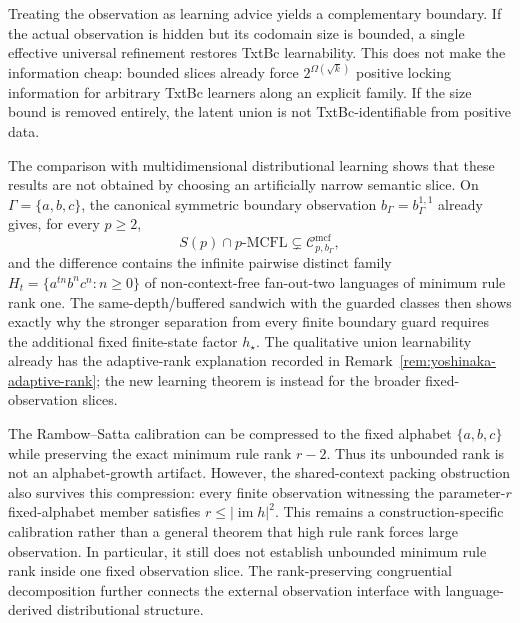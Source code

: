 \documentclass[11pt,a4paper]{article}
\numberwithin{equation}{section}
\theoremstyle{plain}
\theoremstyle{definition}
\theoremstyle{remark}
\newcommand{\Cmcf}[2]{\mathcal{C}^{\mathrm{mcf}}_{#1,#2}}
\begin{document}
Treating the observation as learning advice yields a complementary boundary.
If the actual observation is hidden but its codomain size is bounded, a single
effective universal refinement restores TxtBc learnability.  This does not
make the information cheap: bounded slices already force
$2^{\Omega(\sqrt{k})}$ positive locking information for arbitrary TxtBc
learners along an explicit family.  If the size bound is removed entirely, the
latent union is not TxtBc-identifiable from positive data.

The comparison with multidimensional distributional learning shows that these
results are not obtained by choosing an artificially narrow semantic slice.
On $\Gamma=\{a,b,c\}$, the canonical symmetric boundary observation
$b_\Gamma=b_\Gamma^{1,1}$ already gives, for every $p\ge2$,
\[
  S(p)\cap p\text{-}\mathrm{MCFL}
  \subsetneq
  \Cmcf{p}{b_\Gamma},
\]
and the difference contains the infinite pairwise distinct family
$H_t=\{a^{tn}b^nc^n:n\ge0\}$ of non-context-free fan-out-two languages of
minimum rule rank one.  The same-depth/buffered sandwich with the guarded
classes then shows exactly why the stronger separation from every finite
boundary guard requires the additional fixed finite-state factor $h_\star$.
The qualitative union learnability already has the adaptive-rank explanation
recorded in Remark~\ref{rem:yoshinaka-adaptive-rank}; the new learning theorem
is instead for the broader fixed-observation slices.

The Rambow--Satta calibration can be compressed to the fixed alphabet
$\{a,b,c\}$ while preserving the exact minimum rule rank
$r-2$.  Thus its unbounded rank is not an alphabet-growth artifact.  However,
the shared-context packing obstruction also survives this compression: every
finite observation witnessing the parameter-$r$ fixed-alphabet member
satisfies $r\le|\operatorname{im}h|^2$.  This remains a construction-specific calibration rather than a general theorem
that high rule rank forces large observation.  In particular, it still does
not establish unbounded minimum rule rank inside one fixed observation slice.  The rank-preserving
congruential decomposition further connects the external observation
interface with language-derived distributional structure.
\end{document}
